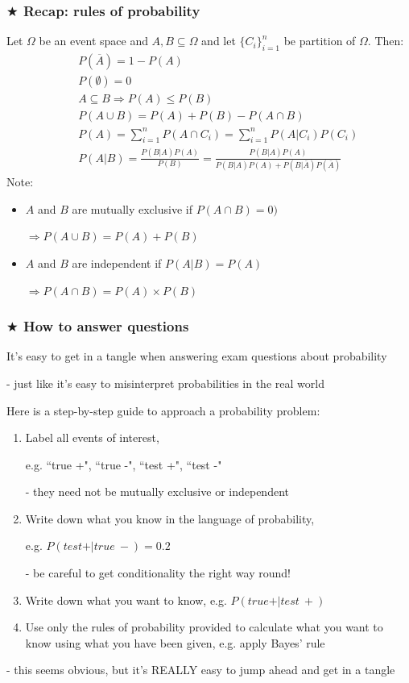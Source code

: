 \documentclass[t,8pt]{beamer}%
\begin{document}
	\begin{frame}
		\frametitle{$\bigstar$ Recap: rules of probability}
		Let $\Omega$ be an event space and $A,B\subseteq \Omega$ and let $\lbrace C_i\rbrace_{i=1}^n$ be partition of $\Omega$. Then:
		\begin{eqnarray}
			&&P(\overline A)=1-P(A)\\
			&&P(\emptyset)=0\\
			&&A\subseteq B\Rightarrow P(A)\leq P(B)\\
			&&P(A\cup B)=P(A)+P(B)-P(A\cap B)\\
			&&P(A)=\sum_{i=1}^nP(A\cap C_i)=\sum_{i=1}^nP(A\vert C_i)P(C_i)\\
			&&P(A\vert B)=\frac{P(B\vert A)P(A)}{P(B)}=\frac{P(B\vert A)P(A)}{P(B\vert A)P(A)+P(B\vert\overline A)P(\overline A)}
		\end{eqnarray}
		Note:
		\begin{itemize}
			\item $A$ and $B$ are mutually exclusive if $P(A\cap B)=0)$ \par
			$\Rightarrow P(A\cup B)=P(A)+P(B)$
			\item $A$ and $B$ are independent if $P(A\vert B)=P(A)$ \par
			$\Rightarrow P(A\cap B)=P(A)\times P(B)$ \par
		\end{itemize}
	\end{frame}
	
	\begin{frame}
		\frametitle{$\bigstar$ How to answer questions}
		It's easy to get in a tangle when answering exam questions about probability \par
		- just like it's easy to misinterpret probabilities in the real world \par
		Here is a step-by-step guide to approach a probability problem:
		\begin{enumerate}
			\item Label all events of interest, \par
			e.g. ``true +", ``true -", ``test +", ``test -" \par
			{\small\color{NavyBlue} - they need not be mutually exclusive or independent}
			\item Write down what you know in the language of probability, \par
			e.g. $P(test +\vert true\ -)=0.2$ \par
			{\small\color{NavyBlue} - be careful to get conditionality the right way round!}
			\item Write down what you want to know, e.g. $P(true +\vert test\ +)$
			\item Use only the rules of probability provided to calculate what you want to know using what you have been given, e.g. apply Bayes' rule
		\end{enumerate}
		{\small\color{NavyBlue} - this seems obvious, but it's REALLY easy to jump ahead and get in a tangle}
	\end{frame}
	
\end{document}
